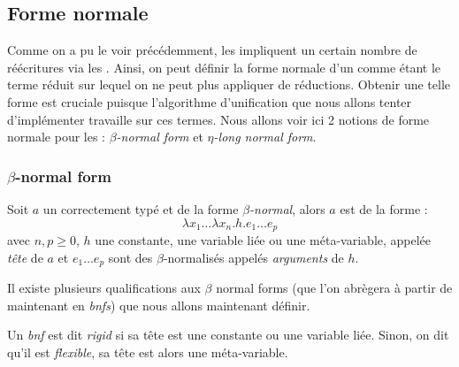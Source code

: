 \subsection{Forme normale}

Comme on a pu le voir précédemment, les \lexps{} impliquent un certain nombre de réécritures via les \breds{}. Ainsi, on peut définir la forme normale d'un \lterm{} comme étant le terme réduit sur lequel on ne peut plus appliquer de réductions. Obtenir une telle forme est cruciale puisque l'algorithme d'unification que nous allons tenter d'implémenter travaille sur ces termes.
Nous allons voir ici 2 notions de forme normale pour les \lterms{} : \textit{$\beta$-normal form} et \textit{$\eta$-long normal form}.

\subsubsection{$\beta$-normal form}

\begin{defn}
Soit $a$ un \lterm{} correctement typé et de la forme \textit{$\beta$-normal}, alors $a$ est de la forme :
\[
    \lambda x_1 \dots \lambda x_n . h . e_1 \dots e_p
\]
avec $n, p \geq 0$, $h$ une constante, une variable liée ou une méta-variable, appelée \textit{tête} de $a$ et $e_1 \dots e_p$ sont des \lterms{} $\beta$-normalisés appelés \textit{arguments} de $h$.
\end{defn}

Il existe plusieurs qualifications aux $\beta$ normal forms (que l'on abrègera à partir de maintenant en \textit{bnfs}) que nous allons maintenant définir.

\begin{defn}
Un \lterm{} \textit{bnf} est dit \textit{rigid} si sa tête est une constante ou une variable liée. Sinon, on dit qu'il est \textit{flexible}, sa tête est alors une méta-variable.
\end{defn}

